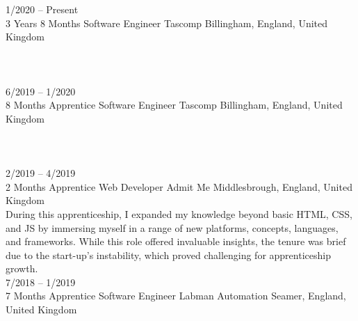 \documentclass[9pt]{developercv} %
\begin{document}
\begin{center}
\end{center}




\begin{entrylist}
	\entry
		{1/2020 -- Present\\3 Years 8 Months}
		{Software Engineer}
		{Tascomp}
		{Billingham, England, United Kingdom\\
		
		\lorem \lorem \lorem \lorem \lorem\\ %
		
		\\
		}\\
	\entry
		{6/2019 -- 1/2020\\8 Months}
		{Apprentice Software Engineer}
		{Tascomp}
		{Billingham, England, United Kingdom\\
		
		\lorem \lorem \lorem \lorem \lorem\\ %
		
		\\
		}\\
	\entry
		{2/2019 -- 4/2019\\2 Months}
		{Apprentice Web Developer}
		{Admit Me}
		{Middlesbrough, England, United Kingdom\\ 
		
		During this apprenticeship, I expanded my knowledge beyond basic HTML, CSS, and JS by immersing myself in a range of new platforms, concepts, languages, and frameworks. While this role offered invaluable insights, the tenure was brief due to the start-up's instability, which proved challenging for apprenticeship growth.
		}\\
	\entry
		{7/2018 -- 1/2019\\7 Months}
		{Apprentice Software Engineer}
		{Labman Automation}
		{Seamer, England, United Kingdom\\ 
		
}
\end{entrylist}
\end{document}
